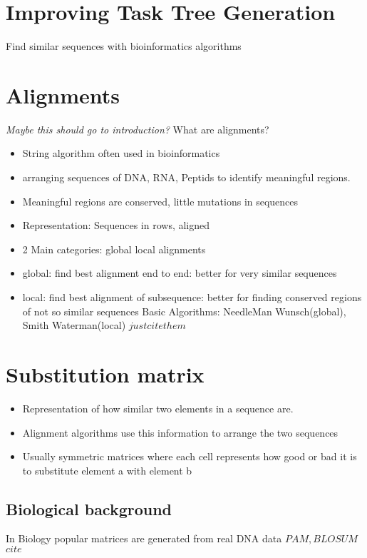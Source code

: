 \section{Improving Task Tree Generation}
Find similar sequences with bioinformatics algorithms

\section{Alignments}
\textit{Maybe this should go to introduction?}
What are alignments? 
\begin{itemize}
	\item String algorithm often used in bioinformatics 
	\item arranging sequences of DNA, RNA, Peptids to identify meaningful regions.
	\item Meaningful regions are conserved, little mutations in sequences
	\item Representation: Sequences in rows, aligned 
	\item 2 Main categories: global local alignments 
	\item global: find best alignment end to end: better for very similar sequences
	\item local: find best alignment of subsequence: better for finding conserved regions of not so similar sequences
	\iten Basic Algorithms: NeedleMan Wunsch(global), Smith Waterman(local) \(just cite them\)
\end{itemize} 
\section{Substitution matrix}
\begin{itemize}
	\item Representation of how similar two elements in a sequence are. 
	\item Alignment algorithms use this information to arrange the two sequences 
	\item Usually symmetric matrices where each cell represents how good or bad it is to substitute element a with element b 
\end{itemize}
\subsection{Biological background}
In Biology popular matrices are generated from real DNA data \(PAM, BLOSUM\) \(cite\)
